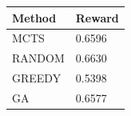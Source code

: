 \begin{tabular}{ll}
\hline
Method & Reward \\
\hline
  MCTS & 0.6596 \\
  RANDOM & 0.6630 \\
  GREEDY & 0.5398 \\
  GA & 0.6577 \\
\hline
\end{tabular}

